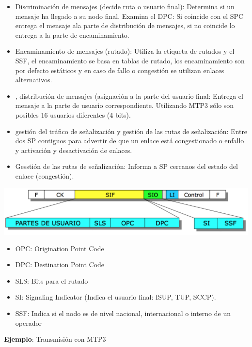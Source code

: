 \documentclass[10pt,portrait, twocolumn]{article}
\begin{document}
	\begin{itemize}
		\item Discriminación de mensajes (decide ruta o usuario final): Determina si un mensaje ha llegado a su nodo final. Examina el DPC: Si coincide con el SPC entrega el mensaje ala parte de distribución de mensajes, si no coincide lo entrega a la parte de encaminamiento.
		\item  Encaminamiento de mensajes (rutado): Utiliza la etiqueta de rutados y el SSF, el encaminamiento se basa en tablas de rutado, los encaminamiento son por defecto estáticos y en caso de fallo o congestión se utilizan enlaces alternativos.
		\item , distribución de mensajes (asignación a la parte del usuario final: Entrega el mensaje a la parte de usuario correspondiente. Utilizando MTP3 sólo son posibles 16 usuarios diferentes (4 bits).
		\item  gestión del tráfico de señalización y gestión de las rutas de señalización: Entre dos SP contiguos para advertir de que un enlace está congestionado o enfallo y activación y desactivación de enlaces.
		\item Gesstión de las rutas de señalización: Informa a SP cercanos del estado del enlace (congestión).
	\end{itemize}

	\begin{center}
		\includegraphics[scale = 0.3]{MTP3E}
	\end{center}
	
	\begin{itemize}
		\item OPC: Origination Point Code
		\item DPC: Destination Point Code
		\item SLS: Bits para el rutado
		\item SI: Signaling Indicator (Indica el usuario final: ISUP, TUP, SCCP).
		\item SSF: Indica si el nodo es de nivel nacional, internacional o interno de un operador
	\end{itemize}
	
\textbf{Ejemplo}: Transmisión con MTP3
	
\end{document}
